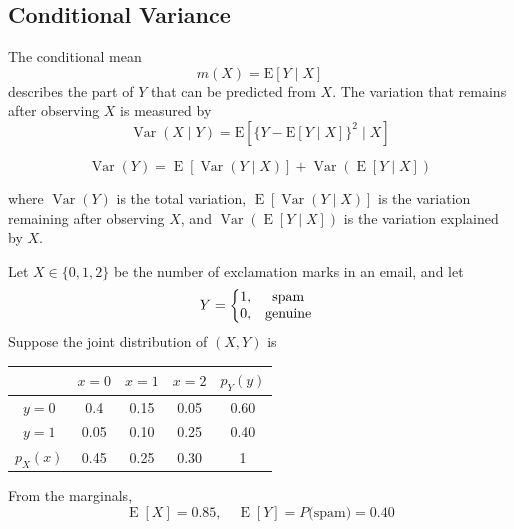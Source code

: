 \subsection{Conditional Variance}
The conditional mean
\[
m(X)=\text{E}[Y \mid X]
\]
describes the part of $Y$ that can be predicted from $X$.
The variation that remains after observing $X$ is measured by
\[
\operatorname{Var}(X \mid Y)=\text{E}[\{{Y-\text{E}[Y \mid X]\}^2 \mid X}]
\]

\begin{definition}
\begin{equation}
\operatorname{Var}(Y)=\operatorname{E}[\operatorname{Var}(Y \mid X)] + \operatorname{Var}(\operatorname{E}[Y \mid X])
\end{equation}
\end{definition}
where $\operatorname{Var}(Y)$ is the total variation, $\operatorname{E}[\operatorname{Var}(Y \mid X)]$ is the variation remaining after observing $X$, and $\operatorname{Var}(\operatorname{E}[Y \mid X])$ is the variation explained by $X$.

\begin{example}
Let $X \in \{0,1,2\}$ be the number of exclamation marks in an email, and let
\begin{equation*}
Y=\left\{\begin{array}{@{}c@{}c}
1,&\quad \mbox{spam}\\
0,&\quad \mbox{genuine}
\end{array}
\right.
\end{equation*}
Suppose the joint distribution of $(X,Y)$ is
\begin{table}[h]
    \centering
    \begin{tabular}{ccccc}\toprule
         &$x=0$& $x=1$&$x=2$& $p_Y(y)$\\\midrule
         $y=0$&   0.4& 0.15&0.05& 0.60\\
         $y=1$&   0.05& 0.10&0.25& 0.40\\
 $p_X(x)$& 0.45& 0.25& 0.30&1\\ \bottomrule 
    \end{tabular}
    \label{tab:placeholder}
\end{table}

From the marginals,
\begin{equation}
    \operatorname{E}[X] =0.85, \quad \operatorname{E}[Y]=P(\text{spam)}=0.40 
\end{equation}
\end{example}





    
